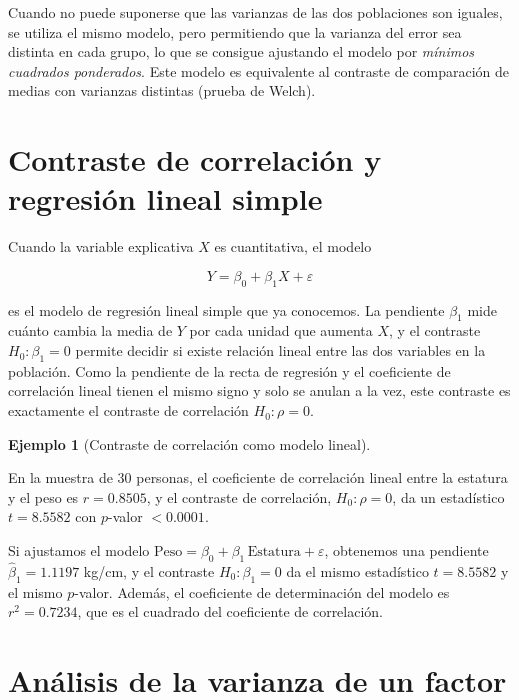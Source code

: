 \documentclass[
  spanish,
  a4paper,
]{scrreport}
\theoremstyle{plain}
\theoremstyle{definition}
\newtheorem{example}{Ejemplo}[chapter]
\theoremstyle{definition}
\theoremstyle{remark}
\begin{document}
Cuando no puede suponerse que las varianzas de las dos poblaciones son
iguales, se utiliza el mismo modelo, pero permitiendo que la varianza
del error sea distinta en cada grupo, lo que se consigue ajustando el
modelo por \emph{mínimos cuadrados ponderados}. Este modelo es
equivalente al contraste de comparación de medias con varianzas
distintas (prueba de Welch).

\section{Contraste de correlación y regresión lineal
simple}\label{contraste-de-correlaciuxf3n-y-regresiuxf3n-lineal-simple}

Cuando la variable explicativa \(X\) es cuantitativa, el modelo

\[
Y = \beta_0 + \beta_1 X + \varepsilon
\]

es el modelo de regresión lineal simple que ya conocemos. La pendiente
\(\beta_1\) mide cuánto cambia la media de \(Y\) por cada unidad que
aumenta \(X\), y el contraste \(H_0:\beta_1=0\) permite decidir si
existe relación lineal entre las dos variables en la población. Como la
pendiente de la recta de regresión y el coeficiente de correlación
lineal tienen el mismo signo y solo se anulan a la vez, este contraste
es exactamente el contraste de correlación \(H_0: \rho=0\).

\begin{example}[Contraste de correlación como modelo
lineal]\protect\hypertarget{exm-correlacion-modelo-lineal}{}\label{exm-correlacion-modelo-lineal}

En la muestra de 30 personas, el coeficiente de correlación lineal entre
la estatura y el peso es \(r=0.8505\), y el contraste de correlación,
\(H_0:\rho=0\), da un estadístico \(t=8.5582\) con \(p\)-valor
\(< 0.0001\).

Si ajustamos el modelo
\(\text{Peso} = \beta_0 + \beta_1\,\text{Estatura} + \varepsilon\),
obtenemos una pendiente \(\hat\beta_1=1.1197\) kg/cm, y el contraste
\(H_0:\beta_1=0\) da el mismo estadístico \(t=8.5582\) y el mismo
\(p\)-valor. Además, el coeficiente de determinación del modelo es
\(r^2=0.7234\), que es el cuadrado del coeficiente de correlación.

\end{example}

\section{Análisis de la varianza de un
factor}\label{anuxe1lisis-de-la-varianza-de-un-factor}
\end{document}
